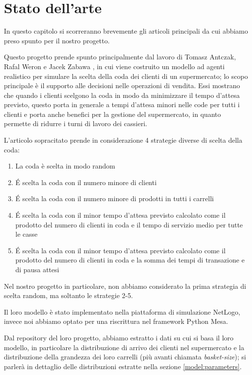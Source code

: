 \chapter{Stato dell'arte}
\label{chapter:sota}

In questo capitolo si scorreranno brevemente gli articoli principali da cui abbiamo preso spunto per il nostro progetto. 

\vspace*{1\baselineskip}

Questo progetto prende spunto principalmente dal lavoro di Tomasz Antczak, Rafal Weron e Jacek Zabawa \cite{article1}, in cui viene costruito un modello ad agenti realistico per simulare la scelta della coda dei clienti di un supermercato; lo scopo principale è il supporto alle decisioni nelle operazioni di vendita. Essi mostrano che quando i clienti scelgono la coda in modo da minimizzare il tempo d'attesa previsto, questo porta in generale a tempi d'attesa minori nelle code per tutti i clienti e porta anche benefici per la gestione del supermercato, in quanto permette di ridurre i turni di lavoro dei cassieri.

L'articolo sopracitato prende in considerazione 4 strategie diverse di scelta della coda:

\begin{enumerate}
	\item La coda è scelta in modo random
	\item \'E scelta la coda con il numero minore di clienti
	\item \'E scelta la coda con il numero minore di prodotti in tutti i carrelli
	\item \'E scelta la coda con il minor tempo d'attesa previsto calcolato come il prodotto del numero di clienti in coda e il tempo di servizio medio per tutte le casse
	\item \'E scelta la coda con il minor tempo d'attesa previsto calcolato come il prodotto del numero di clienti in coda e la somma dei tempi di transazione e di pausa attesi
\end{enumerate}

Nel nostro progetto in particolare, non abbiamo considerato la prima strategia di scelta random, ma soltanto le strategie 2-5.

Il loro modello è stato implementato nella piattaforma di simulazione NetLogo, invece noi abbiamo optato per una riscrittura nel framework Python Mesa. 

Dal repository del loro progetto, abbiamo estratto i dati su cui si basa il loro modello, in particolare la distribuzione di arrivo dei clienti nel supermercato e la distribuzione della grandezza dei loro carrelli (più avanti chiamata \textit{basket-size}); si parlerà in dettaglio delle distribuzioni estratte nella sezione \ref{model:parameters}.

